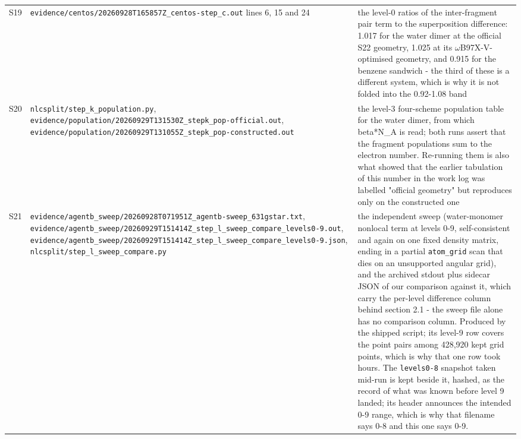 \documentclass[11pt]{article}
\begin{document}
\begin{longtable}{c>{\raggedright\arraybackslash}p{}>{\raggedright\arraybackslash}p{}}
S19 & \texttt{evidence/\allowbreak{}centos/\allowbreak{}20260928T165857Z\_\allowbreak{}centos-step\_\allowbreak{}c.out} lines 6, 15 and 24 & the level-0 ratios of the inter-fragment pair term to the superposition difference: 1.017 for the water dimer at the official S22 geometry, 1.025 at its $\omega$B97X-V-optimised geometry, and 0.915 for the benzene sandwich - the third of these is a different system, which is why it is not folded into the 0.92-1.08 band \\
S20 & \texttt{nlcsplit/\allowbreak{}step\_\allowbreak{}k\_\allowbreak{}population.py}, \texttt{evidence/\allowbreak{}population/\allowbreak{}20260929T131530Z\_\allowbreak{}stepk\_\allowbreak{}pop-official.out}, \texttt{evidence/\allowbreak{}population/\allowbreak{}20260929T131055Z\_\allowbreak{}stepk\_\allowbreak{}pop-constructed.out} & the level-3 four-scheme population table for the water dimer, from which beta*N\_A is read; both runs assert that the fragment populations sum to the electron number. Re-running them is also what showed that the earlier tabulation of this number in the work log was labelled "official geometry" but reproduces only on the constructed one \\
S21 & \texttt{evidence/\allowbreak{}agentb\_\allowbreak{}sweep/\allowbreak{}20260928T071951Z\_\allowbreak{}agentb-sweep\_\allowbreak{}631gstar.txt}, \texttt{evidence/\allowbreak{}agentb\_\allowbreak{}sweep/\allowbreak{}20260929T151414Z\_\allowbreak{}step\_\allowbreak{}l\_\allowbreak{}sweep\_\allowbreak{}compare\_\allowbreak{}levels0-9.out}, \texttt{evidence/\allowbreak{}agentb\_\allowbreak{}sweep/\allowbreak{}20260929T151414Z\_\allowbreak{}step\_\allowbreak{}l\_\allowbreak{}sweep\_\allowbreak{}compare\_\allowbreak{}levels0-9.json}, \texttt{nlcsplit/\allowbreak{}step\_\allowbreak{}l\_\allowbreak{}sweep\_\allowbreak{}compare.py} & the independent sweep (water-monomer nonlocal term at levels 0-9, self-consistent and again on one fixed density matrix, ending in a partial \texttt{atom\_grid} scan that dies on an unsupported angular grid), and the archived stdout plus sidecar JSON of our comparison against it, which carry the per-level difference column behind section 2.1 - the sweep file alone has no comparison column. Produced by the shipped script; its level-9 row covers the point pairs among 428,920 kept grid points, which is why that one row took hours. The \texttt{levels0-8} snapshot taken mid-run is kept beside it, hashed, as the record of what was known before level 9 landed; its header announces the intended 0-9 range, which is why that filename says 0-8 and this one says 0-9. \\

\end{longtable}
\end{document}
